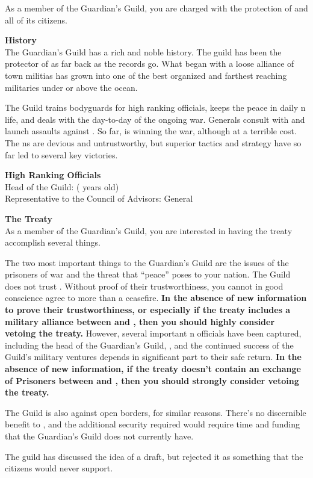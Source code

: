 \documentclass[blue]{NeptuneBall}
\begin{document}
\name{\bGuardian{}}

As a member of the Guardian's Guild, you are charged with the protection of \pAtlantis{} and all of its citizens.

{\bf History}\\
The Guardian's Guild has a rich and noble history. The guild has been the protector of \pAtlantis{} as far back as the records go. What began with a loose alliance of town militias has grown into one of the best organized and farthest reaching militaries under or above the ocean.

The Guild trains bodyguards for high ranking officials, keeps the peace in daily \pAtlantis{}n life, and deals with the day-to-day of the ongoing war. Generals consult with \cKing{\King} \cKing{} and launch assaults against \pPacifica{}. So far, \pAtlantis{} is winning the war, although at a terrible cost. The \pPacifica{}ns are devious and untrustworthy, but superior tactics and strategy have so far led to several key victories.

{\bf High Ranking Officials}\\
Head of the Guild: \cKratos{} (\cKratos{\MYnumber} years old)\\
Representative to the Council of Advisors: General \cGeneral{}

{\bf The Treaty}\\
As a member of the Guardian's Guild, you are interested in having the treaty accomplish several things. 

The two most important things to the Guardian's Guild are the issues of the prisoners of war and the threat that ``peace'' poses to your nation.  The Guild does not trust \pPacifica{}. Without proof of their trustworthiness, you cannot in good conscience agree to more than a ceasefire. {\bf In the absence of new information to prove their trustworthiness, or especially if the treaty includes a military alliance between \pAtlantis{} and \pPacifica{}, then you should highly consider vetoing the treaty.} However, several important \pAtlantis{}n officials have been captured, including the head of the Guardian's Guild, \cKratos{}, and the continued success of the Guild's military ventures depends in significant part to their safe return. {\bf In the absence of new information, if the treaty doesn't contain an exchange of Prisoners between \pAtlantis{} and \pPacifica{}, then you should strongly consider vetoing the treaty.}

The Guild is also against open borders, for similar reasons. There's no discernible benefit to \pAtlantis{}, and the additional security required would require time and funding that the Guardian's Guild does not currently have.

\begin{itemz}[Trivia]
	\item The guild has discussed the idea of a draft, but rejected it as something that the citizens would never support.
\end{itemz}
\end{document}
